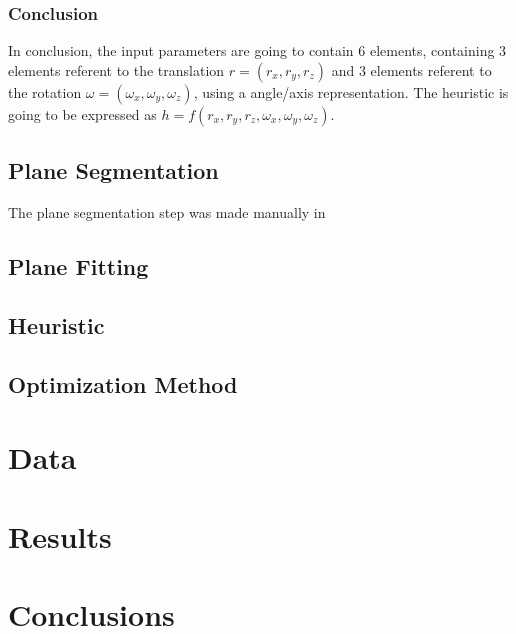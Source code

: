 \subsubsection{Conclusion}

In conclusion, the input parameters are going to contain 6 elements, containing 3 elements referent to the translation $r = (r_x, r_y, r_z)$ and 3 elements referent to the rotation $\omega = (\omega_x, \omega_y, \omega_z)$, using a angle/axis representation. The heuristic is going to be expressed as $h = f(r_x, r_y, r_z, \omega_x, \omega_y, \omega_z)$.

\subsection{Plane Segmentation}

The plane segmentation step was made manually in 

\subsection{Plane Fitting}

\subsection{Heuristic}

\subsection{Optimization Method}

\section{Data}

\section{Results}

\section{Conclusions}